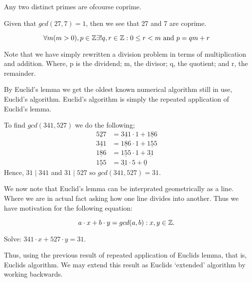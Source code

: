\begin{note}
 Any two distinct primes are ofcourse coprime.
\end{note}

\begin{exmp}
 Given that $gcd(27,7) = 1$, then we see that 27 and 7 are coprime.
\end{exmp}

\begin{lem}
	\[
		\forall m (m > 0), p \in \mathbb{Z} \exists ! q, r \in \mathbb{Z} : 0 \leq r < m \text{ and } p = qm + r
	\]
\end{lem}
Note that we have simply rewritten a division problem in terms of multiplication and addition.
Where, p is the dividend; m, the divisor; q, the quotient; and r, the remainder.

By Euclid's lemma we get the oldest known numerical algorithm still in use, Euclid's algorithm.
Euclid's algorithm is simply the repeated application of Euclid's lemma.

\begin{exmp}
 To find $gcd(341,527)$ we do the following;
 \begin{align*}
  \underline{527} &= \underline{341} \cdot 1 + \underline{186}
  \\
  \underline{341} &= \underline{186} \cdot 1 + \underline{155}
  \\
  \underline{186} &= \underline{155} \cdot 1 + \underline{31}
  \\
  \underline{155} &= \underline{31} \cdot 5 + \underline{0}
 \end{align*}
 Hence, $31 \mid 341$ and $31 \mid 527$ so $gcd(341,527) = 31$.
\end{exmp}

We now note that Euclid's lemma can be interprated geometrically as a line. Where we are in actual fact
asking how one line divides into another. Thus we have motivation for the following equation:

\begin{cor}
 \[
  a \cdot x + b \cdot y = gcd(a,b) : x,y \in \mathbb{Z}.
 \]
\end{cor}

\begin{prob}
 Solve: $341 \cdot x + 527 \cdot y = 31$.
\end{prob}

Thus, using the previous result of repeated application of Euclids lemma, that is, Euclids algorithm.
We may extend this result as Euclids `extended' algorithm by working backwards.


